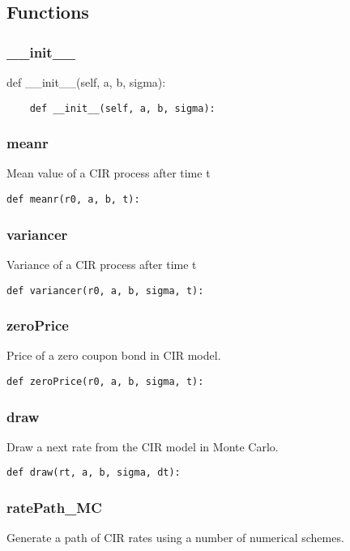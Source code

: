 \documentclass[twoside,11pt]{book}
\begin{document}
\subsection*{Functions}

\subsubsection*{{\bf \_\_init\_\_}}
def \_\_init\_\_(self, a, b, sigma): 

\begin{lstlisting}
    def __init__(self, a, b, sigma):
\end{lstlisting}

\subsubsection*{{\bf meanr}}
Mean value of a CIR process after time t  

\begin{lstlisting}
def meanr(r0, a, b, t):
\end{lstlisting}

\subsubsection*{{\bf variancer}}
Variance of a CIR process after time t  

\begin{lstlisting}
def variancer(r0, a, b, sigma, t):
\end{lstlisting}

\subsubsection*{{\bf zeroPrice}}
Price of a zero coupon bond in CIR model.  

\begin{lstlisting}
def zeroPrice(r0, a, b, sigma, t):
\end{lstlisting}

\subsubsection*{{\bf draw}}
Draw a next rate from the CIR model in Monte Carlo.  

\begin{lstlisting}
def draw(rt, a, b, sigma, dt):
\end{lstlisting}

\subsubsection*{{\bf ratePath\_MC}}
Generate a path of CIR rates using a number of numerical schemes.  
\end{document}
